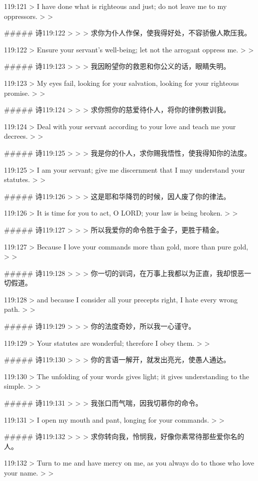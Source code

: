 119:121
> I have done what is righteous and just; do not leave me to my oppressors.
>
> 


##### 诗119:122
> 
>
> 求你为仆人作保，使我得好处，不容骄傲人欺压我。


119:122
> Ensure your servant's well-being; let not the arrogant oppress me.
>
> 


##### 诗119:123
> 
>
> 我因盼望你的救恩和你公义的话，眼睛失明。


119:123
> My eyes fail, looking for your salvation, looking for your righteous promise.
>
> 


##### 诗119:124
> 
>
> 求你照你的慈爱待仆人，将你的律例教训我。


119:124
> Deal with your servant according to your love and teach me your decrees.
>
> 


##### 诗119:125
> 
>
> 我是你的仆人，求你赐我悟性，使我得知你的法度。


119:125
> I am your servant; give me discernment that I may understand your statutes.
>
> 


##### 诗119:126
> 
>
> 这是耶和华降罚的时候，因人废了你的律法。


119:126
> It is time for you to act, O LORD; your law is being broken.
>
> 


##### 诗119:127
> 
>
> 所以我爱你的命令胜于金子，更胜于精金。


119:127
> Because I love your commands more than gold, more than pure gold,
>
> 


##### 诗119:128
> 
>
> 你一切的训词，在万事上我都以为正直，我却恨恶一切假道。


119:128
> and because I consider all your precepts right, I hate every wrong path.
>
> 


##### 诗119:129
> 
>
> 你的法度奇妙，所以我一心谨守。


119:129
> Your statutes are wonderful; therefore I obey them.
>
> 


##### 诗119:130
> 
>
> 你的言语一解开，就发出亮光，使愚人通达。


119:130
> The unfolding of your words gives light; it gives understanding to the simple.
>
> 


##### 诗119:131
> 
>
> 我张口而气喘，因我切慕你的命令。


119:131
> I open my mouth and pant, longing for your commands.
>
> 


##### 诗119:132
> 
>
> 求你转向我，怜悯我，好像你素常待那些爱你名的人。


119:132
> Turn to me and have mercy on me, as you always do to those who love your name.
>
> 


